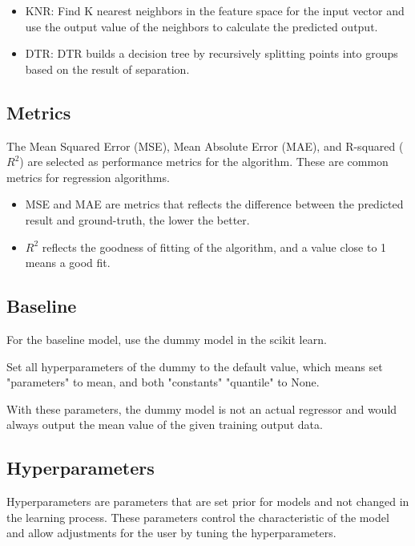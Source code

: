 \documentclass[a4paper]{article}
\begin{document}
\begin{itemize}
    \item KNR: Find K nearest neighbors in the feature space for the input vector and use the output value of the neighbors to calculate the predicted output.
    \item DTR: DTR builds a decision tree by recursively splitting points into groups based on the result of separation. 
\end{itemize}

\subsection{Metrics}

The Mean Squared Error (MSE), Mean Absolute Error (MAE), and R-squared ($R^2$) are selected as performance metrics for the algorithm. These are common metrics for regression algorithms.

\begin{itemize}
    \item MSE and MAE are metrics that reflects the difference between the predicted result and ground-truth, the lower the better.
    \item $R^2$ reflects the goodness of fitting of the algorithm, and a value close to 1 means a good fit. 
\end{itemize}

\subsection{Baseline}

For the baseline model, use the dummy model in the scikit learn. 

Set all hyperparameters of the dummy to the default value, which means set "parameters" to mean, and both "constants" "quantile" to None.

With these parameters, the dummy model is not an actual regressor and would always output the mean value of the given training output data. 

\subsection{Hyperparameters}


Hyperparameters are parameters that are set prior for models and not changed in the learning process. These parameters control the characteristic of the model and allow adjustments for the user by tuning the hyperparameters.
\end{document}
